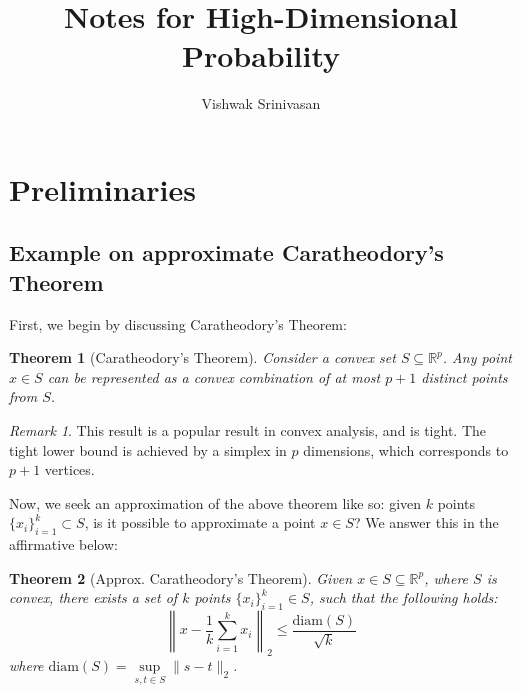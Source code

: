 \documentclass{article}
\title{Notes for High-Dimensional Probability}
\author{Vishwak Srinivasan}
\date{}
\newtheorem{theorem}{Theorem}[subsection]
\theoremstyle{remark}
\newtheorem*{remark}{Remark}
\newcommand{\real}{\mathbb{R}}
\begin{document}
\raggedright

\maketitle
\tableofcontents

\newpage

\section{Preliminaries}
\subsection{Example on approximate Caratheodory's Theorem}

First, we begin by discussing Caratheodory's Theorem:
\begin{theorem}[Caratheodory's Theorem]
\label{thm:approx-caratheodory}
Consider a convex set \(S \subseteq \real^{p}\). Any point \(x \in S\) can be represented as a convex combination of at most \(p + 1\) distinct points from \(S\).
\end{theorem}

\begin{remark}
This result is a popular result in convex analysis, and is tight. The tight lower bound is achieved by a simplex in \(p\) dimensions, which corresponds to \(p + 1\) vertices.
\end{remark}

Now, we seek an approximation of the above theorem like so: given \(k\) points \(\{x_{i}\}_{i=1}^{k} \subset S\), is it possible to approximate a point \(x \in S\)? We answer this in the affirmative below:
\begin{theorem}[Approx. Caratheodory's Theorem]
Given \(x \in S \subseteq \real^{p}\), where \(S\) is convex, there exists a set of \(k\) points \(\{x_{i}\}_{i=1}^{k} \in S\), such that the following holds:
\begin{equation*}
\left\|x - \frac{1}{k}\sum_{i=1}^{k}x_{i}\right\|_{2} \leq \frac{\mathrm{diam}(S)}{\sqrt{k}}
\end{equation*}
where \(\mathrm{diam}(S) = \sup\limits_{s, t \in S} \|s - t\|_{2}\).
\end{theorem}
\end{document}
